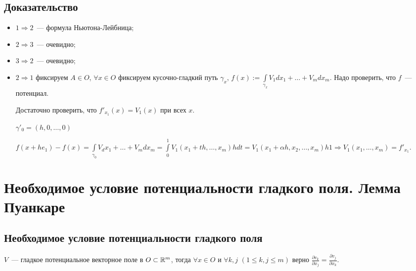 \documentclass{article}
\begin{document}
        \subsection{Доказательство}
        
            \begin{itemize}
            
                \item $1 \Rightarrow 2$~--- формула Ньютона-Лейбница;
                
                \item $2 \Rightarrow 3$~--- очевидно;
                
                \item $3 \Rightarrow 2$~--- очевидно;
                
                \item $2 \Rightarrow 1$ фиксируем $A \in O$, $\forall x \in O$ фиксируем кусочно-гладкий путь $\gamma_x$, $f(x) := \int\limits_{\gamma_x} V_1 dx_1 + \ldots + V_m dx_m$. Надо проверить, что $f$~--- потенциал.
                
                    Достаточно проверить, что $f'_{x_1}(x) = V_1(x)$ при всех $x$.
                    
                    $\gamma'_0 = (h, 0, \ldots, 0)$
                    
                    $f(x + he_1) - f(x) = \int\limits_{\gamma_0} V_ dx_1 + \ldots + V_m dx_m = \int\limits^1_0 V_1(x_1 + th, \ldots, x_m) h dt = V_1(x_1 + \alpha h, x_2, \ldots, x_m) h 1 \Rightarrow V_1(x_1, \ldots, x_m) = f'_{x_1}$.
                    
            \end{itemize}
            
    \newpage
    
    \section{Необходимое условие потенциальности гладкого поля. Лемма Пуанкаре}
    
        \subsection{Необходимое условие потенциальности гладкого поля}
        
            $V$~--- гладкое потенциальное векторное поле в $O \subset \mathbb{R}^m$, тогда $\forall x \in O$ и $\forall k, j$ $(1 \leq k, j \leq m)$ верно $\frac{\partial v_k}{\partial x_j} = \frac{\partial v_j}{\partial x_k}$.
            
\end{document}
